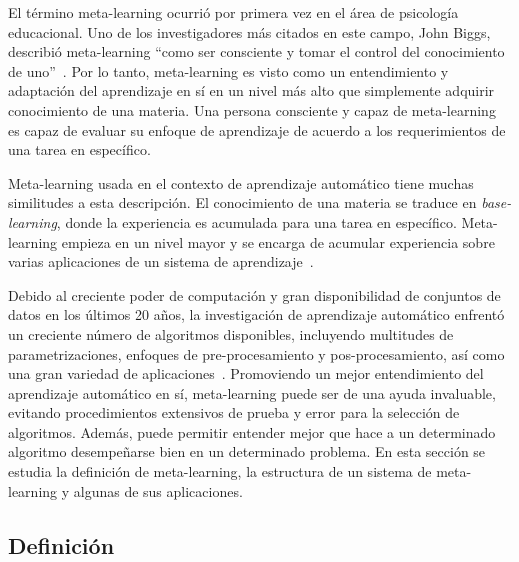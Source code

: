 
El término meta-learning ocurrió por primera vez en el área de psicología educacional. Uno de los investigadores más citados en este campo, John Biggs, describió meta-learning ``como ser consciente y tomar el control del conocimiento de uno''~\cite{biggs1985role}. Por lo tanto, meta-learning es visto como un entendimiento y adaptación del aprendizaje en sí en un nivel más alto que simplemente adquirir conocimiento de una materia. Una persona consciente y capaz de meta-learning es capaz de evaluar su enfoque de aprendizaje de acuerdo a los requerimientos de una tarea en específico.

Meta-learning usada en el contexto de aprendizaje automático tiene muchas similitudes a esta descripción. El conocimiento de una materia se traduce en \textit{base-learning}, donde la experiencia es acumulada para una tarea en específico. Meta-learning empieza en un nivel mayor y se encarga de acumular experiencia sobre varias aplicaciones de un sistema de aprendizaje~\cite{hospedales2021metalearning}.

Debido al creciente poder de computación y gran disponibilidad de conjuntos de datos en los últimos 20 años, la investigación de aprendizaje automático enfrentó un creciente número de algoritmos disponibles, incluyendo multitudes de parametrizaciones, enfoques de pre-procesamiento y pos-procesamiento, así como una gran variedad de aplicaciones~\cite{lemke2013metalearning}. Promoviendo un mejor entendimiento del aprendizaje automático en sí, meta-learning puede ser de una ayuda invaluable, evitando procedimientos extensivos de prueba y error para la selección de algoritmos. Además, puede permitir entender mejor que hace a un determinado algoritmo desempeñarse bien en un determinado problema. En esta sección se estudia la definición de meta-learning, la estructura de un sistema de meta-learning y algunas de sus aplicaciones.

\subsection{Definición}\label{subsec:mtl-definition}

